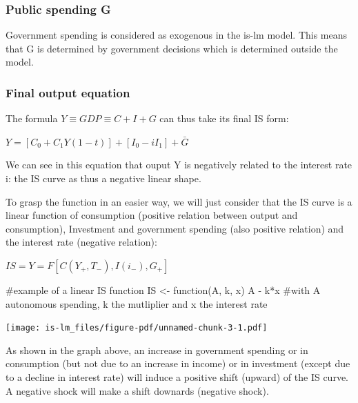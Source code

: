 \documentclass[
  letterpaper,
  DIV=11,
  numbers=noendperiod]{scrreprt}
\newenvironment{Shaded}{\begin{snugshade}}{\end{snugshade}}
\newcommand{\CommentTok}[1]{\textcolor[rgb]{0.37,0.37,0.37}{#1}}
\newcommand{\ControlFlowTok}[1]{\textcolor[rgb]{0.00,0.23,0.31}{#1}}
\newcommand{\NormalTok}[1]{\textcolor[rgb]{0.00,0.23,0.31}{#1}}
\newcommand{\OtherTok}[1]{\textcolor[rgb]{0.00,0.23,0.31}{#1}}
\newcommand{\SpecialCharTok}[1]{\textcolor[rgb]{0.37,0.37,0.37}{#1}}
\begin{document}
\hypertarget{public-spending-g}{%
\subsubsection{Public spending G}\label{public-spending-g}}

Government spending is considered as exogenous in the is-lm model. This
means that G is determined by government decisions which is determined
outside the model.

\hypertarget{final-output-equation}{%
\subsubsection{Final output equation}\label{final-output-equation}}

The formula \(Y \equiv GDP \equiv C + I + G\) can thus take its final IS
form:

\(Y = [C_{0} + C_{1}Y(1-t)] + [I_{0} - iI_{1}] + \bar{G}\)

We can see in this equation that ouput Y is negatively related to the
interest rate i: the IS curve as thus a negative linear shape.

To grasp the function in an easier way, we will just consider that the
IS curve is a linear function of consumption (positive relation between
output and consumption), Investment and government spending (also
positive relation) and the interest rate (negative relation):

\(IS = Y = F[C(Y_{+}, T_{-}), I(i_{-}), G_{+}]\)

\begin{Shaded}
\begin{Highlighting}[]
\CommentTok{\#example of a linear IS function}
\NormalTok{IS }\OtherTok{\textless{}{-}} \ControlFlowTok{function}\NormalTok{(A, k, x) A }\SpecialCharTok{{-}}\NormalTok{ k}\SpecialCharTok{*}\NormalTok{x }\CommentTok{\#with A autonomous spending, k the mutliplier and x the interest rate}
\end{Highlighting}
\end{Shaded}

\texttt{[image: is-lm\_files/figure-pdf/unnamed-chunk-3-1.pdf]}

As shown in the graph above, an increase in government spending or in
consumption (but not due to an increase in income) or in investment
(except due to a decline in interest rate) will induce a positive shift
(upward) of the IS curve. A negative shock will make a shift downards
(negative shock).
\end{document}
